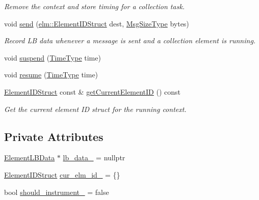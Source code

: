 \begin{DoxyCompactItemize}
\begin{DoxyCompactList}\small\item\em Remove the context and store timing for a collection task. \end{DoxyCompactList}\item 
void \hyperlink{structvt_1_1ctx_1_1_l_b_data_a9db5527f7fa49548e4a856ea1caff73a}{send} (\hyperlink{structvt_1_1elm_1_1_element_i_d_struct}{elm\+::\+Element\+I\+D\+Struct} dest, \hyperlink{namespacevt_a408e86a8c7c89309b52907dc5a513924}{Msg\+Size\+Type} bytes)
\begin{DoxyCompactList}\small\item\em Record LB data whenever a message is sent and a collection element is running. \end{DoxyCompactList}\item 
void \hyperlink{structvt_1_1ctx_1_1_l_b_data_accc285604c55529bfbd04ad244a5722e}{suspend} (\hyperlink{namespacevt_a2b9f28078dc309ad0706b69ded743e69}{Time\+Type} time)
\item 
void \hyperlink{structvt_1_1ctx_1_1_l_b_data_ae398bd79d3e4fc5b865097306e696ac2}{resume} (\hyperlink{namespacevt_a2b9f28078dc309ad0706b69ded743e69}{Time\+Type} time)
\item 
\hyperlink{structvt_1_1ctx_1_1_l_b_data_aad9fac05c3faf80173b273d900db6fb1}{Element\+I\+D\+Struct} const  \& \hyperlink{structvt_1_1ctx_1_1_l_b_data_ac2f63d7854e0c1d4c1c2b9ddf200f8c6}{get\+Current\+Element\+ID} () const
\begin{DoxyCompactList}\small\item\em Get the current element ID struct for the running context. \end{DoxyCompactList}\end{DoxyCompactItemize}
\subsection*{Private Attributes}
\begin{DoxyCompactItemize}
\item 
\hyperlink{structvt_1_1ctx_1_1_l_b_data_a11f1aeb75c01ae0c77d96f94ce1994bb}{Element\+L\+B\+Data} $\ast$ \hyperlink{structvt_1_1ctx_1_1_l_b_data_a766b2b0aa69889fc3e397c7bfbb0b68a}{lb\+\_\+data\+\_\+} = nullptr
\item 
\hyperlink{structvt_1_1ctx_1_1_l_b_data_aad9fac05c3faf80173b273d900db6fb1}{Element\+I\+D\+Struct} \hyperlink{structvt_1_1ctx_1_1_l_b_data_a8d84887a884c7f5783d4ccd7e5effd92}{cur\+\_\+elm\+\_\+id\+\_\+} = \{\}
\item 
bool \hyperlink{structvt_1_1ctx_1_1_l_b_data_a0f36387b1ed5d20e39b72e97251e0efc}{should\+\_\+instrument\+\_\+} = false
\end{DoxyCompactItemize}


